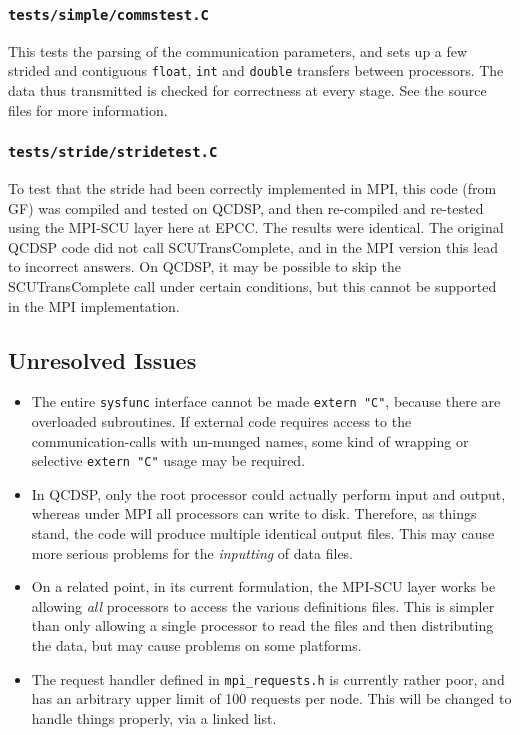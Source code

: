 \documentclass[12pt]{article}
\newcommand{\cde}[1]{{\tt #1}}            %
\begin{document}
\subsubsection{\cde{tests/simple/commstest.C}}
This tests the parsing of the communication parameters, and sets up a
few strided and contiguous \cde{float}, \cde{int} and \cde{double}
transfers between processors.  The data thus transmitted is checked
for correctness at every stage.  See the source files for more
information.

\subsubsection{\cde{tests/stride/stridetest.C}}
To test that the stride had been correctly implemented in MPI, this
code (from GF) was compiled and tested on QCDSP, and then re-compiled
and re-tested using the MPI-SCU layer here at EPCC.  The results were
identical.  The original QCDSP code did not call SCUTransComplete, and
in the MPI version this lead to incorrect answers.  On QCDSP, it may
be possible to skip the SCUTransComplete call under certain
conditions, but this cannot be supported in the MPI implementation.

\subsection{Unresolved Issues}
\begin{itemize}
\item The entire \cde{sysfunc} interface cannot be made \cde{extern
"C"}, because there are overloaded subroutines.  If external code
requires access to the communication-calls with un-munged names, some
kind of wrapping or selective \cde{extern "C"} usage may be required.

\item In QCDSP, only the root processor could actually perform input
and output, whereas under MPI all processors can write to disk.
Therefore, as things stand, the code will produce multiple identical
output files.  This may cause more serious problems for
the \emph{inputting} of data files.

\item On a related point, in its current formulation, the MPI-SCU
layer works be allowing \emph{all} processors to access the various
definitions files.  This is simpler than only allowing a single
processor to read the files and then distributing the data, but may
cause problems on some platforms.

\item The request handler defined in \cde{mpi\_requests.h} is
currently rather poor, and has an arbitrary upper limit of 100
requests per node.  This will be changed to handle things properly,
via a linked list.
\end{itemize}
\end{document}

